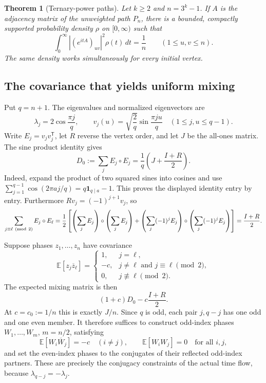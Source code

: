 \documentclass[11pt,a4paper]{article}
\newtheorem{theorem}{Theorem}[section]
\theoremstyle{definition}\newtheorem{definition}[theorem]{Definition}
\theoremstyle{remark}\newtheorem{remark}[theorem]{Remark}
\begin{document}
\begin{theorem}[Ternary-power paths]
\label{thm:ternary-uam}
Let $k\ge2$ and $n=3^k-1$. If $A$ is the adjacency matrix of the
unweighted path $P_n$, there is a bounded, compactly supported probability
density $\rho$ on $[0,\infty)$ such that
\[
 \int_0^\infty |(e^{itA})_{uv}|^2\rho(t)\,dt=\frac1n
 \qquad(1\le u,v\le n).
\]
The same density works simultaneously for every initial vertex.
\end{theorem}

\subsection{The covariance that yields uniform mixing}
Put $q=n+1$. The eigenvalues and normalized eigenvectors are
\[
 \lambda_j=2\cos\frac{\pi j}{q},\qquad
 v_j(u)=\sqrt{\frac2q}\sin\frac{\pi ju}{q}
 \quad(1\le j,u\le q-1).
\]
Write $E_j=v_jv_j^{\mathsf T}$, let $R$ reverse the vertex order, and
let $J$ be the all-ones matrix. The sine product identity gives
\begin{equation}\label{eq:ternary-cesaro}
 D_0:=\sum_j E_j\circ E_j
   =\frac1q\left(J+\frac{I+R}{2}\right).
\end{equation}
Indeed, expand the product of two squared sines into cosines and use
\(\sum_{j=1}^{q-1}\cos(2\pi aj/q)=q\mathbf1_{q\mid a}-1\).
This proves the displayed identity entry by entry.
Furthermore $Rv_j=(-1)^{j+1}v_j$, so
\begin{equation}\label{eq:ternary-parity}
 \sum_{j\equiv\ell\ ({\rm mod}\ 2)}E_j\circ E_\ell
 =\frac12\left[
   \left(\sum_jE_j\right)\circ\left(\sum_jE_j\right)
   +\left(\sum_j(-1)^jE_j\right)\circ
    \left(\sum_j(-1)^jE_j\right)\right]
 =\frac{I+R}{2}.
\end{equation}

Suppose phases $z_1,\ldots,z_n$ have covariance
\begin{equation}\label{eq:ternary-covariance}
 \mathbb E[z_j\overline z_\ell]=
 \begin{cases}
  1,&j=\ell,\\
  -c,&j\ne\ell\text{ and }j\equiv\ell\pmod2,\\
  0,&j\not\equiv\ell\pmod2.
 \end{cases}
\end{equation}
The expected mixing matrix is then
\[
 (1+c)D_0-c\frac{I+R}{2}.
\]
At $c=c_0:=1/n$ this is exactly $J/n$. Since $q$ is odd,
each pair $j,q-j$ has one odd and one even member. It therefore suffices
to construct odd-index phases $W_1,\ldots,W_m$, $m=n/2$, satisfying
\begin{equation}\label{eq:ternary-odd-covariance}
 \mathbb E[W_i\overline W_j]=-c\quad(i\ne j),
 \qquad \mathbb E[W_iW_j]=0\quad\text{for all }i,j,
\end{equation}
and set the even-index phases to the conjugates of their reflected
odd-index partners. These are precisely the conjugacy constraints of
the actual time flow, because $\lambda_{q-j}=-\lambda_j$.
\end{document}
